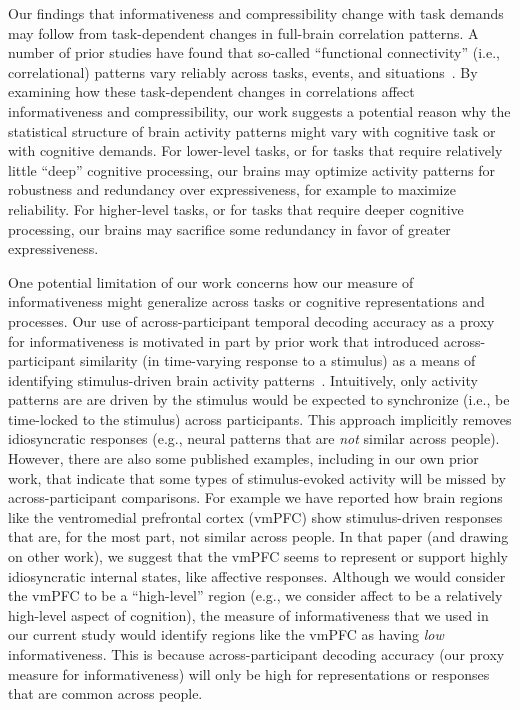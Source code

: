 \documentclass[english, 11pt]{article}
\begin{document}
Our findings that informativeness and compressibility change with task demands
may follow from task-dependent changes in full-brain correlation patterns. A
number of prior studies have found that so-called ``functional connectivity''
(i.e., correlational) patterns vary reliably across tasks, events, and
situations~\citep{SimoEtal16, ColeEtal14, SmitEtal09, OwenEtal21}. By examining
how these task-dependent changes in correlations affect informativeness and
compressibility, our work suggests a potential reason why the statistical
structure of brain activity patterns might vary with cognitive task or with
cognitive demands. For lower-level tasks, or for tasks that require relatively
little ``deep'' cognitive processing, our brains may optimize activity patterns
for robustness and redundancy over expressiveness, for example to maximize
reliability. For higher-level tasks, or for tasks that require deeper cognitive
processing, our brains may sacrifice some redundancy in favor of greater
expressiveness.

One potential limitation of our work concerns how our measure of
informativeness might generalize across tasks or cognitive representations and
processes. Our use of across-participant temporal decoding accuracy as a proxy
for informativeness is motivated in part by prior work that introduced
across-participant similarity (in time-varying response to a stimulus) as a
means of identifying stimulus-driven brain activity
patterns~\citep{SimoEtal16}. Intuitively, only activity patterns are are driven
by the stimulus would be expected to synchronize (i.e., be time-locked to the
stimulus) across participants. This approach implicitly removes idiosyncratic
responses (e.g., neural patterns that are \textit{not} similar across people).
However, there are also some published examples, including in our own prior
work, that indicate that some types of stimulus-evoked activity will be missed
by across-participant comparisons. For example we have reported how brain
regions like the ventromedial prefrontal cortex (vmPFC) show stimulus-driven
responses that are, for the most part, not similar across people. In that paper
(and drawing on other work), we suggest that the vmPFC seems to represent or
support highly idiosyncratic internal states, like affective responses.
Although we would consider the vmPFC to be a ``high-level'' region (e.g., we
consider affect to be a relatively high-level aspect of cognition), the measure
of informativeness that we used in our current study would identify regions
like the vmPFC as having \textit{low} informativeness. This is because
across-participant decoding accuracy (our proxy measure for informativeness)
will only be high for representations or responses that are common across
people.
\end{document}
